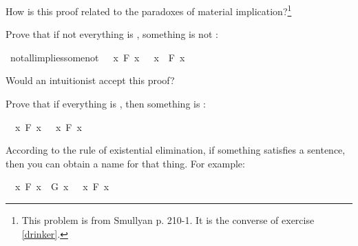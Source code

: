 \begin{isabellebody}
{\isafoldproof}%
%
\isadelimproof
%
\endisadelimproof
%
\begin{isamarkuptext}%
How is this proof related to the paradoxes of material implication?\footnote{This problem is
from Smullyan \cite{smullyan_what_1978} p. 210-1. It is the converse of exercise \ref{drinker}.}%
\end{isamarkuptext}\isamarkuptrue%
%
\begin{isamarkuptext}%
\begin{Exercise} Prove that if not everything is , something is not : \end{Exercise}%
\end{isamarkuptext}\isamarkuptrue%
\isamarkupfalse%
\ not{\isacharunderscore}all{\isacharunderscore}implies{\isacharunderscore}some{\isacharunderscore}not{\isacharcolon}\ {\isachardoublequoteopen}{\isasymnot}\ {\isacharparenleft}{\isasymforall}\ x{\isachardot}\ F\ x{\isacharparenright}\ {\isasymlongrightarrow}\ {\isacharparenleft}{\isasymexists}\ x{\isachardot}\ {\isasymnot}\ F\ x{\isacharparenright}{\isachardoublequoteclose}%
\isadelimproof
\ %
\endisadelimproof
%
\isatagproof
{}\isamarkupfalse%
%
\endisatagproof
{\isafoldproof}%
%
\isadelimproof
%
\endisadelimproof
%
\begin{isamarkuptext}%
Would an intuitionist accept this proof?%
\end{isamarkuptext}\isamarkuptrue%
%
\begin{isamarkuptext}%
\begin{Exercise} Prove that if everything is , then something is : \end{Exercise}%
\end{isamarkuptext}\isamarkuptrue%
\isamarkupfalse%
\ {\isachardoublequoteopen}{\isacharparenleft}{\isasymforall}\ x{\isachardot}\ F\ x{\isacharparenright}\ {\isasymlongrightarrow}\ {\isacharparenleft}{\isasymexists}\ x{\isachardot}\ F\ x{\isacharparenright}{\isachardoublequoteclose}%
\isadelimproof
\ %
\endisadelimproof
%
\isatagproof
{}\isamarkupfalse%
%
\endisatagproof
{\isafoldproof}%
%
\isadelimproof
%
\endisadelimproof
%
\isamarkuptrue%
%
\begin{isamarkuptext}%
According to the rule of existential elimination, if something satisfies a sentence, then
you can obtain a name for that thing. For example:%
\end{isamarkuptext}\isamarkuptrue%
\isamarkupfalse%
\ {\isachardoublequoteopen}{\isacharparenleft}{\isasymexists}\ x{\isachardot}\ F\ x\ {\isasymand}\ G\ x{\isacharparenright}\ {\isasymlongrightarrow}\ {\isacharparenleft}{\isasymexists}\ x{\isachardot}\ F\ x{\isacharparenright}{\isachardoublequoteclose}\isanewline

\end{isabellebody}
